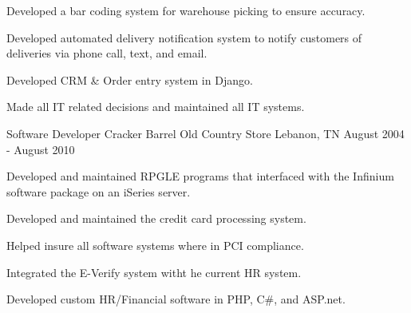 \begin{cventries}
{\begin{cvitems}
        \item {Developed a bar coding system for warehouse picking to ensure accuracy.}
        \item {Developed automated delivery notification system to notify customers of deliveries via phone call, text, and email.}
        \item {Developed CRM \& Order entry system in Django.}
        \item {Made all IT related decisions and maintained all IT systems.}
      \end{cvitems} 
    }
  \cventry
    {Software Developer}
    {Cracker Barrel Old Country Store}
    {Lebanon, TN}
    {August 2004 - August 2010}
    {
      \begin{cvitems}
        \item {Developed and maintained RPGLE programs that interfaced with the Infinium software package on an iSeries server.}
        \item {Developed and maintained the credit card processing system.}
        \item {Helped insure all software systems where in PCI compliance.}
        \item {Integrated the E-Verify system witht he current HR system.}
        \item {Developed custom HR/Financial software in PHP, C\#, and ASP.net.}
      \end{cvitems}
    }
\end{cventries}
